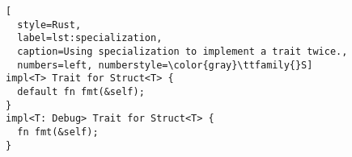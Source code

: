 \begin{lstlisting}[
  style=Rust,
  label=lst:specialization,
  caption=Using specialization to implement a trait twice.,
  numbers=left, numberstyle=\color{gray}\ttfamily{}S]
impl<T> Trait for Struct<T> {
  default fn fmt(&self);
}
impl<T: Debug> Trait for Struct<T> {
  fn fmt(&self);
}
\end{lstlisting}

